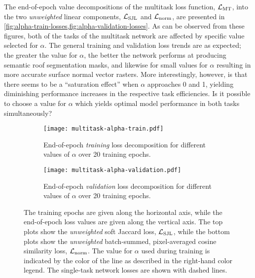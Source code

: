 The end-of-epoch value decompositions of the multitask loss function, $\mathcal{L}_{\mathrm{MT}}$, into the two \emph{unweighted} linear components, $\mathcal{L}_{\mathrm{SJL}}$ and $\mathcal{L}_{\mathrm{norm}}$, are presented in \cref{fig:alpha-train-losses,fig:alpha-validation-losses}.
As can be observed from these figures, both of the tasks of the multitask network are affected by specific value selected for $\alpha$.
The general training and validation loss trends are as expected; the greater the value for $\alpha$, the better the network performs at producing semantic roof segmentation masks, and likewise for small values for $\alpha$ resulting in more accurate surface normal vector rasters.
More interestingly, however, is that there seems to be a \enquote{saturation effect} when $\alpha$ approaches 0 and 1, yielding diminishing performance increases in the respective task efficiencies.
Is it possible to choose a value for $\alpha$ which yields optimal model performance in both tasks simultaneously?
\begin{figure}[H]
  \centering
  \begin{subfigure}[t]{\textwidth}
    \centering
    \texttt{[image: multitask-alpha-train.pdf]}
    \caption{%
      End-of-epoch \emph{training} loss decomposition for different values of $\alpha$ over 20 training epochs.
    }
    \label{fig:alpha-train-losses}
  \end{subfigure}
  \par\bigskip %
  \begin{subfigure}[t]{\textwidth}
    \centering
    \texttt{[image: multitask-alpha-validation.pdf]}
    \caption{%
      End-of-epoch \emph{validation} loss decomposition for different values of $\alpha$ over 20 training epochs.
    }
    \label{fig:alpha-validation-losses}
  \end{subfigure}
  \caption[End-of-epoch multitask loss decomposition for different values of $\alpha$ over 20 training epochs.]{%
    The training epochs are given along the horizontal axis, while the end-of-epoch loss values are given along the vertical axis.
    The top plots show the \emph{unweighted} soft Jaccard loss, $\mathcal{L}_{\mathrm{SJL}}$, while the bottom plots show the \emph{unweighted} batch-summed, pixel-averaged cosine similarity loss, $\mathcal{L}_{\mathrm{norm}}$.
    The value for $\alpha$ used during training is indicated by the color of the line as described in the right-hand color legend.
    The single-task network losses are shown with dashed lines.
  }
\end{figure}

